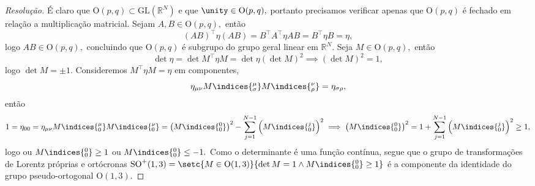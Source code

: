 \begin{proof}[Resolução]
    É claro que \(\mathrm{O}(p,q) \subset \mathrm{GL}(\mathbb{R}^N)\) e que \(\unity \in \mathrm{O}(p,q),\) portanto precisamos verificar apenas que \(\mathrm{O}(p,q)\) é fechado em relação a multiplicação matricial. Sejam \(A, B \in \mathrm{O}(p,q),\) então
    \begin{equation*}
        (AB)^\top \eta (AB) = B^\top A^\top \eta A B = B^\top \eta B = \eta,
    \end{equation*}
    logo \(AB \in \mathrm{O}(p,q),\) concluindo que \(\mathrm{O}(p,q)\) é subgrupo do grupo geral linear em \(\mathbb{R}^N.\) Seja \(M \in \mathrm{O}(p,q),\) então
    \begin{equation*}
        \det \eta = \det{M^\top \eta M} =\det \eta (\det M)^2 \implies (\det M)^2 = 1,
    \end{equation*}
    logo \(\det M = \pm1.\) Consideremos \(M^\top \eta M = \eta\) em componentes,
    \begin{equation*}
        \eta_{\mu\nu} M\indices{^\mu_\sigma} M\indices{^\nu_\rho} = \eta_{\sigma \rho},
    \end{equation*}
    então
    \begin{equation*}
        1 = \eta_{00} = \eta_{\mu\nu} M\indices{^\mu_0} M\indices{^\nu_0} = \left(M\indices{^0_0}\right)^2 - \sum_{j = 1}^{N - 1} \left(M\indices{^j_0}\right)^2 \implies \left(M\indices{^0_0}\right)^2 = 1 + \sum_{j = 1}^{N - 1} \left(M\indices{^j_0}\right)^2 \geq 1,
    \end{equation*}
    logo ou \(M\indices{^0_0} \geq 1\) ou \(M\indices{^0_0} \leq -1.\) Como o determinante é uma função contínua, segue que o grupo de transformações de Lorentz próprias e ortócronas \(\mathrm{SO}^+(1,3) = \setc{M \in \mathrm{O}(1,3)}{\det M = 1 \land M\indices{^0_0} \geq 1}\) é a componente da identidade do grupo pseudo-ortogonal \(\mathrm{O}(1,3)\).


\end{proof}
